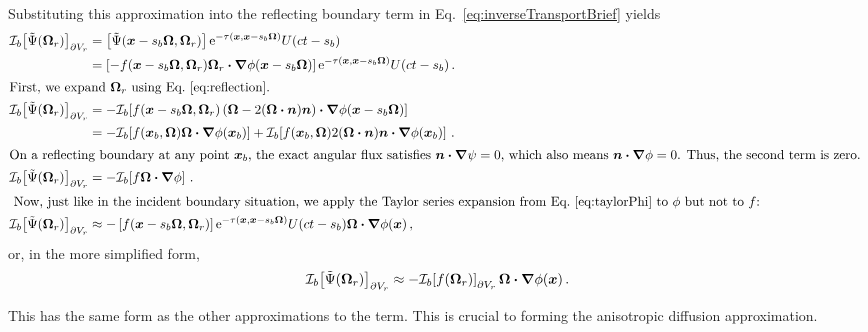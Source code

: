 Substituting this approximation into the reflecting boundary term in
Eq.~\eqref{eq:inverseTransportBrief} yields
\begin{align*}
\lopinv{b}{\tilde\Psi(\vec{\Omega}_r)}_{\partial V_r}
  &= \left[\tilde\Psi(\vec{x} - s_b\vec{\Omega}, \vec{\Omega}_r) \right]
    \eexp^{ -\tau(\vec{x}, \vec{x} - s_b \vec{\Omega})}
    U(ct - s_b)
\\
  &= \left[-f(\vec{x} - s_b\vec{\Omega}, \vec{\Omega}_r) \vec{\Omega}_r 
  \vd \grad \phi(\vec{x} - s_b\vec{\Omega}) \right]
  \eexp^{ -\tau(\vec{x}, \vec{x} - s_b \vec{\Omega})}
  U(ct - s_b) \,.
\\ 
\intertext{First, we expand $\vec{\Omega}_r$ using Eq.~\eqref{eq:reflection}.
}
\lopinv{b}{\tilde\Psi(\vec{\Omega}_r)}_{\partial V_r}
  &= - \lopinv{b}{f(\vec{x} - s_b\vec{\Omega}, \vec{\Omega}_r)
\left(  \vec{\Omega} - 2(\vec{\Omega} \vd \vec{n}) \vec{n} \right)
  \vd \grad \phi(\vec{x} - s_b\vec{\Omega}) }
  \\
  &= -\lopinv{b}{f(\vec{x}_b,\vec{\Omega}) \vec{\Omega} \vd \grad
  \phi(\vec{x}_b)}
  + \lopinv{b}{f(\vec{x}_b,\vec{\Omega}) 2(\vec{\Omega} \vd \vec{n}) \vec{n} \vd \grad \phi(\vec{x}_b) } \,.
\\ 
\intertext{On a reflecting boundary at any point $\vec{x}_b$, the exact angular flux satisfies $\vec{n} \vd
\grad \psi = 0$, which also means $\vec{n} \vd \grad \phi=0$. Thus, the second
term is zero.
}
\lopinv{b}{\tilde\Psi(\vec{\Omega}_r)}_{\partial V_r}
&= -\lopinv{b}{f \vec{\Omega} \vd \grad \phi} \,.
\\ \intertext{ Now, just like in the incident boundary situation, we apply the
Taylor
series expansion from Eq.~\eqref{eq:taylorPhi} to $\phi$ but not to $f$:
}
\lopinv{b}{\tilde\Psi(\vec{\Omega}_r)}_{\partial V_r}
&\approx
-\left[f(\vec{x} - s_b\vec{\Omega}, \vec{\Omega}_r)
  \right]
  \eexp^{ -\tau(\vec{x}, \vec{x} - s_b \vec{\Omega})}
  U(ct - s_b) \vec{\Omega} \vd \grad \phi(\vec{x})\,,
\end{align*}
or, in the more simplified form,
\begin{equation} \label{eq:reflApprox}
\mathcal{I}_{b}\!\left[\tilde\Psi(\bm{\Omega}_r)\right]_{\partial V_r}
\approx  
- \mathcal{I}_{b}\!\left[f(\bm{\Omega}_r)\right]_{\partial V_r}
\bm{\Omega} \bm{\cdot} \bm{\nabla} \phi(\bm{x}) \,.
\end{equation}

This has the same form as the other approximations to the term. This is crucial
to forming the anisotropic diffusion approximation.

